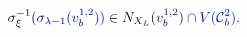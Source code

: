 \documentclass[12pt]{article}
\begin{document}
\makeatletter
\renewcommand*{\@textcolor}[3]{%
  \protect\leavevmode
  \begingroup
    \color#1{#2}#3%
  \endgroup
}
\makeatother
\begin{displaymath}
\mathcolor[RGB]{0,0,15}{\sigma} _ { \mathcolor[RGB]{0,0,30}{\xi} } ^ { \mathcolor[RGB]{0,0,45}{-} \mathcolor[RGB]{0,0,60}{1} } \mathcolor[RGB]{0,0,75}{(} \mathcolor[RGB]{0,0,90}{\sigma} _ { \mathcolor[RGB]{0,0,105}{\lambda} \mathcolor[RGB]{0,0,120}{-} \mathcolor[RGB]{0,0,135}{1} } \mathcolor[RGB]{0,0,150}{(} \mathcolor[RGB]{0,0,165}{v} _ { \mathcolor[RGB]{0,0,180}{b} } ^ { \mathcolor[RGB]{0,0,195}{1} \mathcolor[RGB]{0,0,210}{,} \mathcolor[RGB]{0,0,225}{2} } \mathcolor[RGB]{0,0,240}{)} \mathcolor[RGB]{0,0,255}{)} \mathcolor[RGB]{0,15,0}{\in} \mathcolor[RGB]{0,15,15}{N} _ { \mathcolor[RGB]{0,15,30}{X} _ { \mathcolor[RGB]{0,15,45}{L} } } \mathcolor[RGB]{0,15,60}{(} \mathcolor[RGB]{0,15,75}{v} _ { \mathcolor[RGB]{0,15,90}{b} } ^ { \mathcolor[RGB]{0,15,105}{1} \mathcolor[RGB]{0,15,120}{,} \mathcolor[RGB]{0,15,135}{2} } \mathcolor[RGB]{0,15,150}{)} \mathcolor[RGB]{0,15,165}{\cap} \mathcolor[RGB]{0,15,180}{V} \mathcolor[RGB]{0,15,195}{(} \mathcal { \mathcolor[RGB]{0,15,210}{C} } _ { \mathcolor[RGB]{0,15,225}{b} } ^ { \mathcolor[RGB]{0,15,240}{2} } \mathcolor[RGB]{0,15,255}{)} \mathcolor[RGB]{0,30,0}{.}
\end{displaymath}
\end{document}
